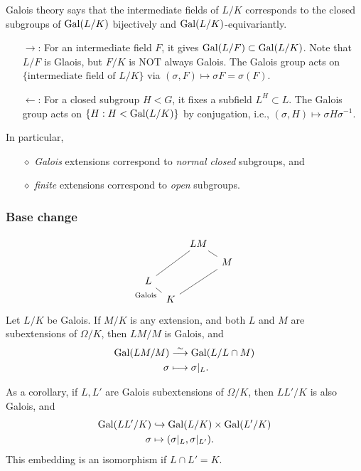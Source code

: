 Galois theory says that the intermediate fields of $L/K$ corresponds to the closed subgroups of $\operatorname{Gal}(L/K)$ bijectively and $\operatorname{Gal}(L/K)$-equivariantly.
\begin{enumerate}
    \item [$\rightarrow$:] For an intermediate field $F$, it gives $\operatorname{Gal}(L/F)\subset \operatorname{Gal}(L/K)$. Note that $L/F$ is Glaois, but $F/K$ is NOT always Galois.
    The Galois group acts on $\{\text{intermediate field of } L/K\}$ via $(\sigma, F) \mapsto \sigma F = \sigma(F)$.
    \item [$\leftarrow$:] For a closed subgroup $H < G$, it fixes a subfield $L^H \subset L$. The Galois group acts on $\{H : H < \operatorname{Gal}(L/K)\}$ by conjugation, i.e., $(\sigma, H) \mapsto \sigma H\sigma^{-1}$.
\end{enumerate}
In particular,\begin{enumerate}
    \item [$\diamond$] \textit{Galois} extensions correspond to \textit{normal closed} subgroups, and
    \item [$\diamond$] \textit{finite} extensions correspond to \textit{open} subgroups.
\end{enumerate}

\subsubsection*{Base change}
\begin{proposition}\label{field extension base change}
\[\begin{tikzcd}[sep = tiny]
	&& LM \\
	&&& M \\
	L \\
	& K
	\arrow[no head, from=2-4, to=1-3]
	\arrow[no head, from=3-1, to=1-3]
	\arrow["{\text{Galois}}", no head, from=4-2, to=3-1]
	\arrow[no head, from=4-2, to=2-4]
\end{tikzcd}\]    Let $L/K$ be Galois. If $M/K$ is any extension, and both $L$ and $M$ are subextensions of $\Omega/K$, then $LM/M$ is Galois, and
    \begin{align*}
        \operatorname{Gal}(LM/M) &\stackrel{\sim}{\longrightarrow}\operatorname{Gal}(L/L\cap M)\\
        \sigma&\longmapsto \sigma|_L.
    \end{align*}
\end{proposition}
As a corollary, if $L, L'$ are Galois subextensions of $\Omega/K$, then $LL'/K$ is also Galois, and \begin{align*}
    \operatorname{Gal}(LL'/K)&\hookrightarrow \operatorname{Gal}(L/K)\times \operatorname{Gal}(L'/K)\\
    \sigma &\mapsto (\sigma|_L, \sigma|_{L'}).
\end{align*}
This embedding is an isomorphism if $L\cap L' = K$.




